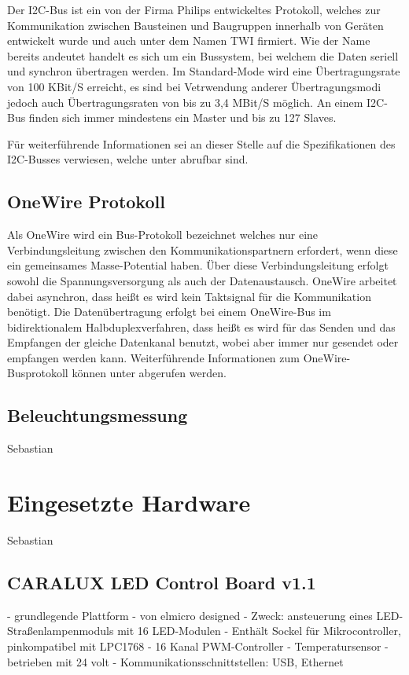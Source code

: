 \documentclass[a4paper,12pt]{scrartcl}
\begin{document}
Der I2C-Bus ist ein von der Firma Philips entwickeltes Protokoll, welches zur Kommunikation zwischen Bausteinen und Baugruppen innerhalb von Ger\"aten
entwickelt wurde und auch unter dem Namen TWI firmiert. Wie der Name bereits andeutet handelt es sich um ein Bussystem, bei welchem die Daten seriell und
synchron \"ubertragen werden. Im Standard-Mode wird eine \"Ubertragungsrate von 100 KBit/S erreicht, es sind bei Vetrwendung anderer \"Ubertragungsmodi jedoch
auch \"Ubertragungsraten von bis zu 3,4 MBit/S m\"oglich. An einem I2C-Bus finden sich immer mindestens ein Master und bis zu 127 Slaves.

F\"ur weiterf\"uhrende Informationen sei an dieser Stelle auf die Spezifikationen des I2C-Busses verwiesen, welche unter \cite{speci2c} abrufbar
sind.

\subsection{OneWire Protokoll}
Als OneWire wird ein Bus-Protokoll bezeichnet welches nur eine Verbindungsleitung zwischen den Kommunikationspartnern erfordert, wenn diese ein gemeinsames
Masse-Potential haben. \"Uber diese Verbindungsleitung erfolgt sowohl die Spannungsversorgung als auch der Datenaustausch. OneWire arbeitet dabei asynchron,
dass hei\ss{}t es wird kein Taktsignal f\"ur die Kommunikation ben\"otigt. Die Daten\"ubertragung erfolgt bei einem OneWire-Bus im bidirektionalem
Halbduplexverfahren, dass hei\ss{}t es wird f\"ur das Senden und das Empfangen der gleiche Datenkanal benutzt, wobei aber immer nur gesendet oder empfangen
werden kann. Weiterf\"uhrende Informationen zum OneWire-Busprotokoll k\"onnen unter \cite{spec1wire} abgerufen werden.

\subsection{Beleuchtungsmessung}
Sebastian

\section{Eingesetzte Hardware}
Sebastian
\subsection{CARALUX LED Control Board v1.1}
- grundlegende Plattform
- von elmicro designed
- Zweck: ansteuerung eines LED-Straßenlampenmoduls mit 16 LED-Modulen
- Enthält Sockel für Mikrocontroller, pinkompatibel mit LPC1768
- 16 Kanal PWM-Controller
- Temperatursensor
- betrieben mit 24 volt
- Kommunikationsschnittstellen: USB, Ethernet
\end{document}
